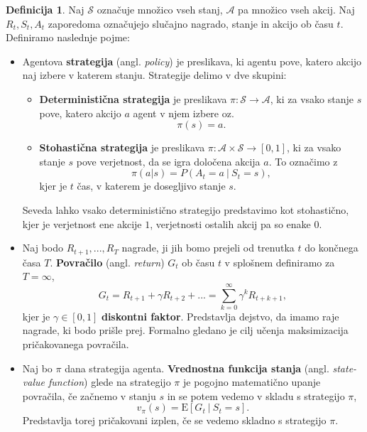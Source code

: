 \documentclass[12pt,a4paper]{amsart}
\theoremstyle{definition} %
\newtheorem{definicija}{Definicija}[section]
\theoremstyle{plain} %
\begin{document}
\begin{definicija}
    Naj $\mathcal{S}$ označuje množico vseh stanj, $\mathcal{A}$ pa množico vseh akcij. Naj $R_t,
    S_t, A_t$ zaporedoma označujejo slučajno nagrado, stanje in akcijo ob času $t$. Definiramo naslednje 
    pojme: 
    \begin{itemize}
        \item   Agentova \textbf{strategija} (angl. \textit{policy}) je preslikava, ki agentu pove, 
                katero akcijo naj izbere v katerem stanju. Strategije delimo v dve skupini:
                \begin{itemize}
                    \item \textbf{Deterministična strategija} je preslikava $\pi: \mathcal{S} 
                    \rightarrow \mathcal{A}$, ki za vsako stanje $s$ pove, katero akcijo $a$ agent v njem 
                    izbere oz.
                    $$
                    \pi(s) = a.
                    $$
                    \item \textbf{Stohastična strategija} je preslikava $\pi: \mathcal{A} \times 
                    \mathcal{S} \rightarrow [0, 1]$, ki za vsako stanje $s$ pove verjetnost, da se igra 
                    določena akcija $a$. To označimo z
                    $$
                    \pi(a | s) = P(A_t = a~|~S_t = s),
                    $$
                    kjer je $t$ čas, v katerem je dosegljivo stanje $s$.
                \end{itemize}
                Seveda lahko vsako deterministično strategijo predstavimo kot stohastično, kjer je 
                verjetnost ene akcije $1$, verjetnosti ostalih akcij pa so enake $0$.
        
        \item Naj bodo $R_{t+1}, ...,R_T$ nagrade, ji jih bomo prejeli od trenutka 
                $t$ do končnega časa $T$. \textbf{Povračilo} (angl. \textit{return}) $G_t$ ob času $t$ 
                v splošnem definiramo za $T=\infty$,
                $$
                G_t = R_{t+1} + \gamma R_{t+2} + ... = \sum_{k=0}^\infty \gamma^k R_{t + k + 1} ,
                $$
                kjer je $\gamma \in [0,1]$ \textbf{diskontni faktor}. Predstavlja dejstvo, da 
                imamo raje nagrade, ki bodo prišle prej. Formalno gledano je cilj učenja 
                maksimizacija pričakovanega povračila.

         \item Naj bo $\pi$ dana strategija agenta. \textbf{Vrednostna funkcija 
                stanja} (angl. \textit{state-value function}) glede na strategijo $\pi$ je 
                pogojno matematično upanje povračila, če začnemo v stanju $s$ in se potem vedemo 
                v skladu s strategijo $\pi$, 
                \begin{equation}\label{vfs}
                v_\pi(s) = \mathrm{E} [G_t~|~S_t = s].
                \end{equation}
                Predstavlja torej pričakovani izplen, če se vedemo skladno s strategijo $\pi$.


\end{itemize}
\end{definicija}
\end{document}
